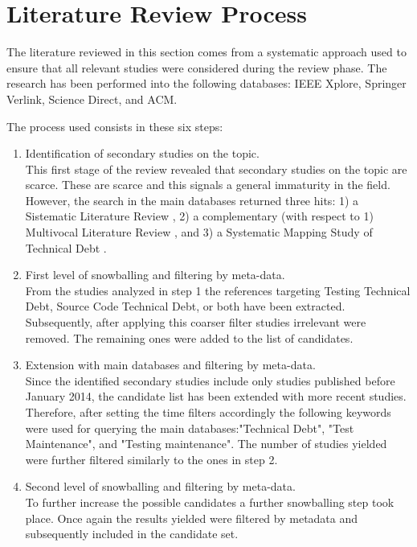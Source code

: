 \section{Literature Review Process} \label{literature_review_process}
The literature reviewed in this section comes from a systematic approach used to ensure that all relevant studies were considered during the review phase. The research has been performed into the following databases: IEEE Xplore, Springer Verlink, Science Direct, and ACM.

The process used consists in these six steps:
\begin{enumerate}
    \item Identification of secondary studies on the topic.\\
        This first stage of the review revealed that secondary studies on the topic are scarce. These are scarce and this signals a general immaturity in the field. However, the search in the main databases returned three hits: 1) a Sistematic Literature Review \cite{exploration_of_td}, 2) a complementary (with respect to 1) Multivocal Literature Review \cite{exploration_of_td2}, and 3) a Systematic Mapping Study of Technical Debt \cite{mapping_study_td}.
        
        
    \item First level of snowballing and filtering by meta-data.\\
        From the studies analyzed in step 1 the references targeting Testing Technical Debt, Source Code Technical Debt, or both have been extracted. Subsequently, after applying this coarser filter studies irrelevant were removed. The remaining ones were added to the list of candidates. 
        
    \item Extension with main databases and filtering by meta-data.\\
    Since the identified secondary studies include only studies published before January 2014, the candidate list has been extended with more recent studies. Therefore, after setting the time filters accordingly the following keywords were used for querying the main databases:"Technical Debt", "Test Maintenance", and "Testing maintenance". The number of studies yielded were further filtered similarly to the ones in step 2.
    
    
    \item Second level of snowballing and filtering by meta-data.\\
        To further increase the possible candidates a further snowballing step took place. Once again the results yielded were filtered by metadata and subsequently included in the candidate set.
    

\end{enumerate}
